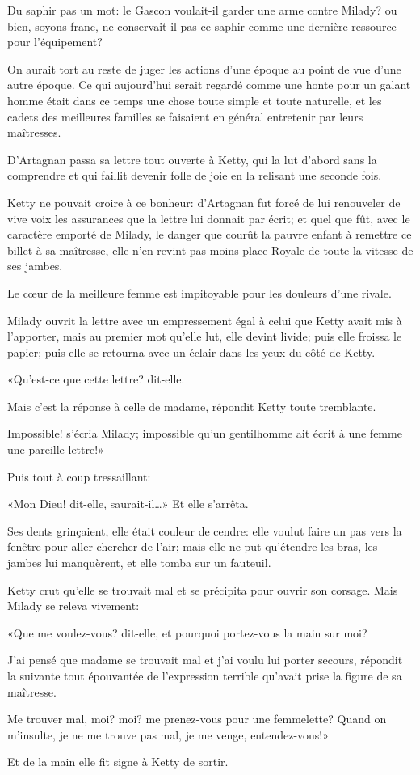 Du saphir pas un mot: le Gascon voulait-il garder une arme contre Milady? ou bien, soyons franc, ne conservait-il pas ce saphir comme une dernière ressource pour l'équipement? 

On aurait tort au reste de juger les actions d'une époque au point de vue d'une autre époque. Ce qui aujourd'hui serait regardé comme une honte pour un galant homme était dans ce temps une chose toute simple et toute naturelle, et les cadets des meilleures familles se faisaient en général entretenir par leurs maîtresses. 

D'Artagnan passa sa lettre tout ouverte à Ketty, qui la lut d'abord sans la comprendre et qui faillit devenir folle de joie en la relisant une seconde fois. 

Ketty ne pouvait croire à ce bonheur: d'Artagnan fut forcé de lui renouveler de vive voix les assurances que la lettre lui donnait par écrit; et quel que fût, avec le caractère emporté de Milady, le danger que courût la pauvre enfant à remettre ce billet à sa maîtresse, elle n'en revint pas moins place Royale de toute la vitesse de ses jambes. 

Le cœur de la meilleure femme est impitoyable pour les douleurs d'une rivale. 

Milady ouvrit la lettre avec un empressement égal à celui que Ketty avait mis à l'apporter, mais au premier mot qu'elle lut, elle devint livide; puis elle froissa le papier; puis elle se retourna avec un éclair dans les yeux du côté de Ketty. 

«Qu'est-ce que cette lettre? dit-elle. 

\speak  Mais c'est la réponse à celle de madame, répondit Ketty toute tremblante. 

\speak  Impossible! s'écria Milady; impossible qu'un gentilhomme ait écrit à une femme une pareille lettre!» 

Puis tout à coup tressaillant: 

«Mon Dieu! dit-elle, saurait-il\dots» Et elle s'arrêta. 

Ses dents grinçaient, elle était couleur de cendre: elle voulut faire un pas vers la fenêtre pour aller chercher de l'air; mais elle ne put qu'étendre les bras, les jambes lui manquèrent, et elle tomba sur un fauteuil. 

Ketty crut qu'elle se trouvait mal et se précipita pour ouvrir son corsage. Mais Milady se releva vivement: 

«Que me voulez-vous? dit-elle, et pourquoi portez-vous la main sur moi? 

\speak  J'ai pensé que madame se trouvait mal et j'ai voulu lui porter secours, répondit la suivante tout épouvantée de l'expression terrible qu'avait prise la figure de sa maîtresse. 

\speak  Me trouver mal, moi? moi? me prenez-vous pour une femmelette? Quand on m'insulte, je ne me trouve pas mal, je me venge, entendez-vous!» 

Et de la main elle fit signe à Ketty de sortir.